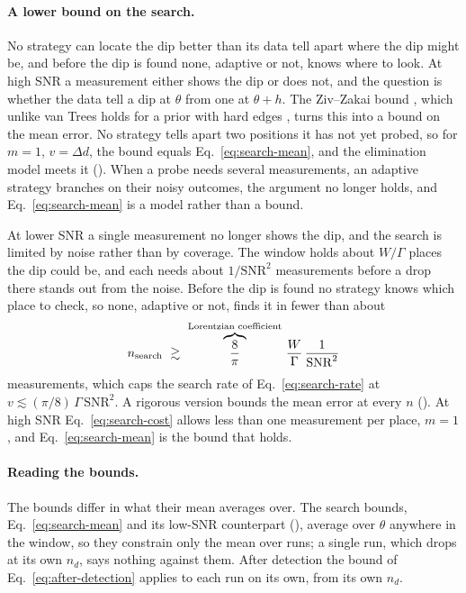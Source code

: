 \paragraph{A lower bound on the search.} No strategy can locate the dip better than its data tell apart where the
dip might be, and before the dip is found none, adaptive or not, knows where to look. At high SNR a measurement
either shows the dip or does not, and the question is whether the data tell a dip at $\theta$ from one at
$\theta+h$. The Ziv--Zakai bound \cite{zivzakai1969,bell1997}, which unlike van Trees holds for a prior with hard
edges \cite{daurelio2022}, turns this into a bound on the mean error. No strategy tells apart two positions it has
not yet probed, so for $m=1$, $v=\Delta d$, the bound equals Eq.~\eqref{eq:search-mean}, and the elimination model
meets it (). When a probe needs several measurements, an adaptive strategy branches on their noisy
outcomes, the argument no longer holds, and Eq.~\eqref{eq:search-mean} is a model rather than a bound.

At lower SNR a single measurement no longer shows the dip, and the search is limited by noise rather than by
coverage. The window holds about $W/\Gamma$ places the dip could be, and each needs about $1/\mathrm{SNR}^2$
measurements before a drop there stands out from the noise. Before the dip is found no strategy knows which place to
check, so none, adaptive or not, finds it in fewer than about
\begin{equation}
  n_{\rm search}\ \gtrsim\ \overbrace{\frac{8}{\pi}}^{\text{Lorentzian coefficient}}\,\frac{W}{\Gamma}\,\frac{1}{\mathrm{SNR}^2}
      \label{eq:search-cost}
\end{equation}
measurements, which caps the search rate of Eq.~\eqref{eq:search-rate} at
$v\lesssim(\pi/8)\,\Gamma\,\mathrm{SNR}^2$. A rigorous version bounds the mean error at every $n$ \cite{garivier2019} (). At high SNR
Eq.~\eqref{eq:search-cost} allows less than one measurement per place, $m=1$, and Eq.~\eqref{eq:search-mean} is the bound
that holds.

\paragraph{Reading the bounds.} The bounds differ in what their mean averages over. The search bounds,
Eq.~\eqref{eq:search-mean} and its low-SNR counterpart (), average over $\theta$ anywhere in the window, so they
constrain only the mean over runs; a single run, which drops at its own $n_d$, says nothing against them. After
detection the bound of Eq.~\eqref{eq:after-detection} applies to each run on its own, from its own $n_d$.

